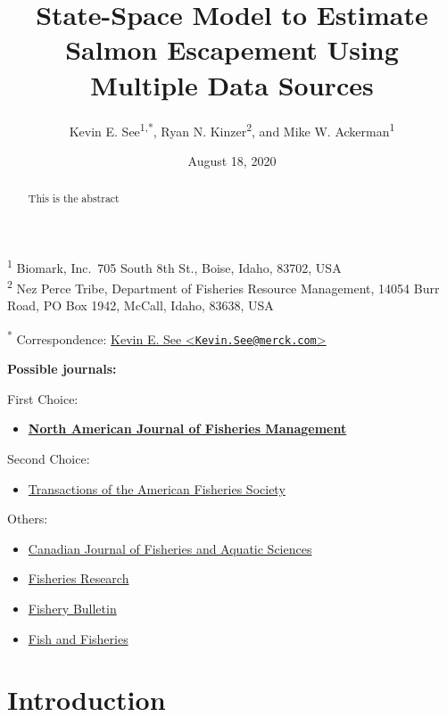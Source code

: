 \documentclass[
  12pt,
]{article}
\title{State-Space Model to Estimate Salmon Escapement Using Multiple Data Sources}
\author{Kevin E. See\textsuperscript{1,*}, Ryan N. Kinzer\textsuperscript{2}, and Mike W. Ackerman\textsuperscript{1}}
\date{August 18, 2020}
\providecommand{\tightlist}{%
  \setlength{\itemsep}{0pt}\setlength{\parskip}{0pt}}
\begin{document}
\maketitle
\begin{abstract}
This is the abstract
\end{abstract}

\textsuperscript{1} Biomark, Inc.~705 South 8th St., Boise, Idaho, 83702, USA\\
\textsuperscript{2} Nez Perce Tribe, Department of Fisheries Resource Management, 14054 Burr Road, PO Box 1942, McCall, Idaho, 83638, USA

\textsuperscript{*} Correspondence: \href{mailto:Kevin.See@merck.com}{Kevin E. See \textless{}\href{mailto:Kevin.See@merck.com}{\nolinkurl{Kevin.See@merck.com}}\textgreater{}}

\textbf{Possible journals:}

First Choice:

\begin{itemize}
\tightlist
\item
  \textbf{\href{https://afspubs.onlinelibrary.wiley.com/journal/15488675}{North American Journal of Fisheries Management}}
\end{itemize}

Second Choice:

\begin{itemize}
\tightlist
\item
  \href{https://afspubs.onlinelibrary.wiley.com/journal/15488659}{Transactions of the American Fisheries Society}
\end{itemize}

Others:

\begin{itemize}
\item
  \href{http://www.nrcresearchpress.com/page/cjfas/editors}{Canadian Journal of Fisheries and Aquatic Sciences}
\item
  \href{https://www.journals.elsevier.com/fisheries-research}{Fisheries Research}
\item
  \href{http://fishbull.noaa.gov/}{Fishery Bulletin}
\item
  \href{http://onlinelibrary.wiley.com/journal/10.1111/(ISSN)1467-2979/homepage/ProductInformation.html}{Fish and Fisheries}
\end{itemize}

\hypertarget{introduction}{%
\section{Introduction}\label{introduction}}
\end{document}

